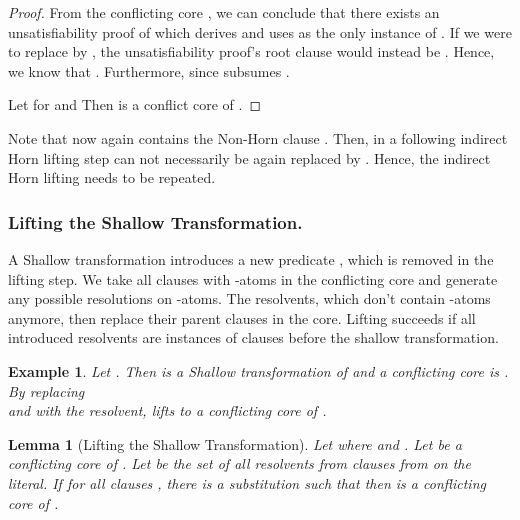 \documentclass{llncs}
\newtheorem{lem}[theorem]{Lemma}
\newtheorem{exmp}{Example}
\begin{document}
\begin{proof}
From the conflicting core , we can conclude that there exists an unsatisfiability proof of  which derives  and uses   as the only instance of . If we were to replace  by  , the unsatisfiability proof's root clause would instead be .
Hence, we know that . 
Furthermore,  since  subsumes .

Let  for  and 
Then   is a conflict core of  .
\end{proof}

Note that  now again contains the Non-Horn clause . 
Then, in a following indirect Horn lifting step  can not necessarily be again replaced by  .
Hence, the indirect Horn lifting needs to be repeated.

\subsubsection{Lifting the Shallow Transformation.}
A Shallow transformation introduces a new predicate , which is removed in the lifting step.
We take all clauses with -atoms in the conflicting core and generate any 
possible resolutions on -atoms. 
The resolvents, which don't contain -atoms anymore, then replace their parent clauses in the core.
Lifting succeeds if all introduced resolvents are instances of clauses before the shallow
transformation.


\begin{exmp}\label{LiftShallowEx}
Let .
Then   is a Shallow transformation of 
and  a conflicting core is  .
By replacing \\
 and  with the resolvent,  lifts to  a conflicting core of .
\end{exmp} 

\begin{lem}[Lifting the Shallow Transformation]\label{liftshallow}
Let  where  and .
Let  be a conflicting core of . 
Let  be the set of all resolvents from  clauses from  on the  literal.
If for all clauses ,  there is a substitution  such that  then
 is a conflicting core of .
\end{lem}
\end{document}
